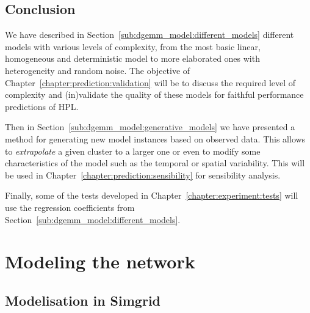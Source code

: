         \subsection{Conclusion}%
            We have described in Section~\ref{sub:dgemm_model:different_models} different models with various levels of
            complexity, from the most basic linear, homogeneous and deterministic model to more elaborated ones with
            heterogeneity and random noise. The objective of Chapter~\ref{chapter:prediction:validation} will be to
            discuss the required level of complexity and (in)validate the quality of these models for faithful
            performance predictions of HPL.

            Then in Section~\ref{sub:dgemm_model:generative_models} we have presented a method for generating new model
            instances based on observed data. This allows to \emph{extrapolate} a given cluster to a larger one or even
            to modify some characteristics of the model such as the temporal or spatial variability. This will be used
            in Chapter~\ref{chapter:prediction:sensibility} for sensibility analysis.

            Finally, some of the tests developed in Chapter~\ref{chapter:experiment:tests} will use the regression
            coefficients from Section~\ref{sub:dgemm_model:different_models}.

    \section{Modeling the network}
    \label{sec:network_model}

        \subsection{Modelisation in Simgrid}%

